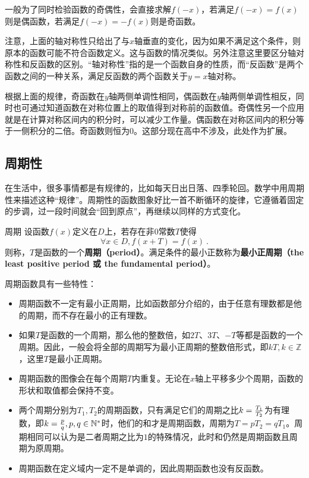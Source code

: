 一般为了同时检验函数的奇偶性，会直接求解$f(-x)$，若满足$f(-x)=f(x)$则是偶函数，若满足$f(-x)=-f(x)$则是奇函数。

注意，上面的轴对称性只给出了与$x$轴垂直的变化，因为如果不满足这个条件，则原本的函数可能不符合函数定义。这与函数的情况类似。另外注意这里要区分轴对称性和反函数的区别。“轴对称性”指的是一个函数自身的性质，而“反函数”是两个函数之间的一种关系，满足反函数的两个函数关于$y=x$轴对称。

根据上面的规律，奇函数在$y$轴两侧单调性相同，偶函数在$y$轴两侧单调性相反，同时也可通过知道函数在对称位置上的取值得到对称前的函数值。奇偶性另一个应用就是在计算对称区间内的积分时，可以减少工作量。偶函数在对称区间内的积分等于一侧积分的二倍。奇函数则恒为0。这部分现在高中不涉及，此处作为扩展。

\subsection{周期性}

在生活中，很多事情都是有规律的，比如每天日出日落、四季轮回。数学中用周期性来描述这种“规律”。周期性的函数图象好比一首不断循环的旋律，它遵循着固定的步调，过一段时间就会“回到原点”，再继续以同样的方式变化。

\begin{definition}{周期}
设函数$f(x)$定义在$D$上，若存在非$0$常数$T$使得
\begin{equation}
\forall x\in D,f(x+T)=f(x)~.
\end{equation}
则称，$T$是函数的一个\textbf{周期（period）}。满足条件的最小正数称为\textbf{最小正周期（the least positive period 或 the fundamental period）}。
\end{definition}

周期函数具有一些特性：
\begin{itemize}
\item 周期函数不一定有最小正周期，比如函数部分介绍的，由于任意有理数都是他的周期，而不存在最小的正有理数。
\item 如果$T$是函数的一个周期，那么他的整数倍，如$2T$、$3T$、$-T$等都是函数的一个周期。因此，一般会将全部的周期写为最小正周期的整数倍形式，即$kT,k\in \mathbb{Z}$，这里$T$是最小正周期。
\item 周期函数的图像会在每个周期$T$内重复。无论在$x$轴上平移多少个周期，函数的形状和取值都会保持不变。
\item 两个周期分别为$T_1,T_2$的周期函数，只有满足它们的周期之比$k={T_1\over T_2}$为有理数，即$k={p\over q},p,q\in\mathbb{N}^*$时，他们的和才是周期函数，周期为$T=pT_2=qT_1$。周期相同可以认为是二者周期之比为$1$的特殊情况，此时和仍然是周期函数且周期为原周期。
\item 周期函数在定义域内一定不是单调的，因此周期函数也没有反函数。
\end{itemize}

